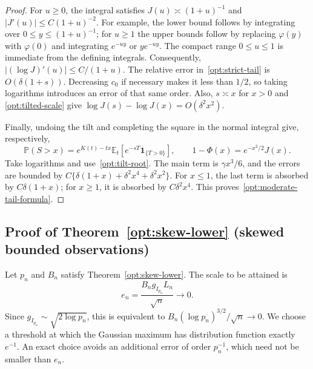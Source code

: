 \documentclass[11pt,letterpaper]{article}
\theoremstyle{remark}
\newcommand{\E}{\mathbb E}
\newcommand{\Pp}{\mathbb P}
\newcommand{\ind}{\mathbf 1}
\begin{document}
\begin{proof}
For $u\ge0$, the integral satisfies
$J(u)\asymp(1+u)^{-1}$ and $|J'(u)|\le C(1+u)^{-2}$.
For example, the lower bound follows by integrating over
$0\le y\le(1+u)^{-1}$; for $u\ge1$ the upper bounds follow
by replacing $\varphi(y)$ with $\varphi(0)$ and integrating
$e^{-uy}$ or $ye^{-uy}$. The compact range $0\le u\le1$
is immediate from the defining integrals. Consequently,
$|(\log J)'(u)|\le C/(1+u)$.
The relative error in~\eqref{opt:strict-tail} is
$O(\delta(1+s))$. Decreasing $c_0$ if necessary makes it less
than $1/2$, so taking logarithms introduces an error of that
same order. Also, $s\asymp x$ for $x>0$ and
\eqref{opt:tilted-scale} give
$\log J(s)-\log J(x)=O(\delta^2x^2)$.

Finally, undoing the tilt and completing the square in the normal
integral give, respectively,
\[
 \Pp(S>x)=e^{K(t)-tx}\E_t[e^{-sT}\ind_{\{T>0\}}],\qquad
 1-\Phi(x)=e^{-x^2/2}J(x).
\]
Take logarithms and use~\eqref{opt:tilt-root}. The main term is
$\gamma x^3/6$, and the errors are bounded by
$C\{\delta(1+x)+\delta^2x^4+\delta^2x^2\}$.
For $x\le1$, the last term is absorbed by $C\delta(1+x)$;
for $x\ge1$, it is absorbed by $C\delta^2x^4$.
This proves~\eqref{opt:moderate-tail-formula}.
\end{proof}

\subsection{Proof of Theorem~\ref*{opt:skew-lower} (skewed bounded observations)}
\label{app:skew-proof}

Let $p_n$ and $B_n$ satisfy Theorem~\ref{opt:skew-lower}.
The scale to be attained is
\[
 e_n=\frac{B_n g_{I_{p_n}}L_n}{\sqrt n}\longrightarrow0.
\]
Since $g_{I_{p_n}}\sim\sqrt{2\log p_n}$, this is equivalent
to $B_n(\log p_n)^{3/2}/\sqrt n\to0$. We choose a threshold
at which the Gaussian maximum has distribution function exactly
$e^{-1}$. An exact choice avoids an additional error of order
$p_n^{-1}$, which need not be smaller than $e_n$.
\end{document}

